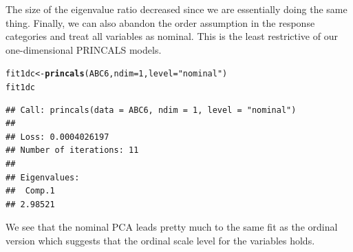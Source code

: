 \documentclass[10pt,nojss,nofooter,fleqn]{jss}\usepackage[]{graphicx}\usepackage[]{color}
\makeatletter
\newcommand{\hlnum}[1]{\textcolor[rgb]{0.686,0.059,0.569}{#1}}%
\newcommand{\hlstr}[1]{\textcolor[rgb]{0.192,0.494,0.8}{#1}}%
\newcommand{\hlstd}[1]{\textcolor[rgb]{0.345,0.345,0.345}{#1}}%
\newcommand{\hlkwb}[1]{\textcolor[rgb]{0.69,0.353,0.396}{#1}}%
\newcommand{\hlkwc}[1]{\textcolor[rgb]{0.333,0.667,0.333}{#1}}%
\newcommand{\hlkwd}[1]{\textcolor[rgb]{0.737,0.353,0.396}{\textbf{#1}}}%
\newenvironment{kframe}{%
 \def\at@end@of@kframe{}%
 \ifinner\ifhmode%
  \def\at@end@of@kframe{\end{minipage}}%
  \begin{minipage}{\columnwidth}%
 \fi\fi%
 \def\FrameCommand##1{\hskip\@totalleftmargin \hskip-\fboxsep
 \colorbox{shadecolor}{##1}\hskip-\fboxsep
     \hskip-\linewidth \hskip-\@totalleftmargin \hskip\columnwidth}%
 \MakeFramed {\advance\hsize-\width
   \@totalleftmargin\z@ \linewidth\hsize
   \@setminipage}}%
 {\par\unskip\endMakeFramed%
 \at@end@of@kframe}
\newenvironment{knitrout}{}{} %
\makeatother
\begin{document}
The size of the eigenvalue ratio decreased since we are essentially doing the same thing. 
Finally, we can also abandon the order assumption in the response categories and treat all variables 
as nominal. This is the least restrictive of our one-dimensional PRINCALS models.

\begin{knitrout}
\color{fgcolor}\begin{kframe}
\begin{alltt}
\hlstd{fit1dc} \hlkwb{<-} \hlkwd{princals}\hlstd{(ABC6,} \hlkwc{ndim} \hlstd{=} \hlnum{1}\hlstd{,} \hlkwc{level} \hlstd{=} \hlstr{"nominal"}\hlstd{)}
\hlstd{fit1dc}
\end{alltt}
\begin{verbatim}
## Call: princals(data = ABC6, ndim = 1, level = "nominal")
## 
## Loss: 0.0004026197
## Number of iterations: 11 
## 
## Eigenvalues:
##  Comp.1 
## 2.98521
\end{verbatim}
\end{kframe}
\end{knitrout}

We see that the nominal PCA leads pretty much to the same fit as the ordinal version which suggests that 
the ordinal scale level for the variables holds. 
\end{document}

